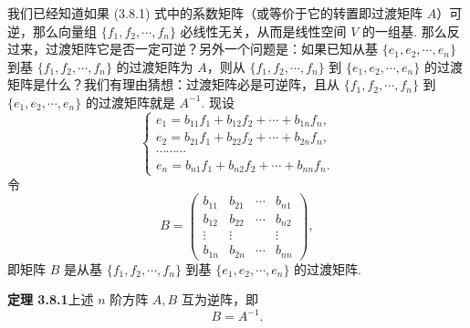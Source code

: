 \documentclass[UTF8,12pt,a4paper,fontset=fandol]{ctexart}
\begin{document}
我们已经知道如果 (3.8.1) 式中的系数矩阵（或等价于它的转置即过渡矩阵 $A$）可逆，那么向量组 $\{f_1,f_2,\cdots,f_n\}$ 必线性无关，从而是线性空间 $V$ 的一组基. 那么反过来，过渡矩阵它是否一定可逆？另外一个问题是：如果已知从基 $\{e_1,e_2,\cdots,e_n\}$ 到基 $\{f_1,f_2,\cdots,f_n\}$ 的过渡矩阵为 $A$，则从 $\{f_1,f_2,\cdots,f_n\}$ 到 $\{e_1,e_2,\cdots,e_n\}$ 的过渡矩阵是什么？我们有理由猜想：过渡矩阵必是可逆阵，且从 $\{f_1,f_2,\cdots,f_n\}$ 到 $\{e_1,e_2,\cdots,e_n\}$ 的过渡矩阵就是 $A^{-1}$. 现设
\begin{equation}
\left\{\begin{array}{l}
e_1=b_{11}f_1+b_{12}f_2+\cdots+b_{1n}f_n,\\
e_2=b_{21}f_1+b_{22}f_2+\cdots+b_{2n}f_n,\\
\cdots\cdots\cdots\\
e_n=b_{n1}f_1+b_{n2}f_2+\cdots+b_{nn}f_n.
\end{array}\right.
\tag{3.8.4}
\end{equation}
令
\[
B=\left(\begin{array}{cccc}
b_{11}&b_{21}&\cdots&b_{n1}\\
b_{12}&b_{22}&\cdots&b_{n2}\\
\vdots&\vdots&&\vdots\\
b_{1n}&b_{2n}&\cdots&b_{nn}
\end{array}\right),
\]
即矩阵 $B$ 是从基 $\{f_1,f_2,\cdots,f_n\}$ 到基 $\{e_1,e_2,\cdots,e_n\}$ 的过渡矩阵.

\noindent\textbf{定理 3.8.1}\quad 上述 $n$ 阶方阵 $A,B$ 互为逆阵，即
\[
B=A^{-1}.
\]
\end{document}
